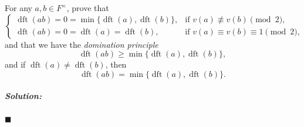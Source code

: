 \documentclass[12pt, a4paper]{article}
\newenvironment{solution}
  {\paragraph{\textit{Solution:}}\par\medskip}
  {\hfill$\blacksquare$\vspace{0.1cm}}
\begin{document}
For any $a,b\in F^\times$, prove that
\[
    \begin{cases}
        \operatorname{dft}(ab)=0
        =
        \min\{\operatorname{dft}(a),\operatorname{dft}(b)\},
        & \text{if } v(a)\not\equiv v(b)\pmod 2,\\
        \operatorname{dft}(ab)=0
        =
        \operatorname{dft}(a)=\operatorname{dft}(b),
        & \text{if } v(a)\equiv v(b)\equiv 1\pmod 2,
    \end{cases}
\]
and that we have the \emph{domination principle}
\[
    \operatorname{dft}(ab)
    \geq
    \min\{\operatorname{dft}(a),\operatorname{dft}(b)\},
\]
and if $\operatorname{dft}(a)\neq \operatorname{dft}(b)$, then
\[
    \operatorname{dft}(ab)
    =
    \min\{\operatorname{dft}(a),\operatorname{dft}(b)\}.
\]
\begin{solution}

\end{solution}
\end{document}

